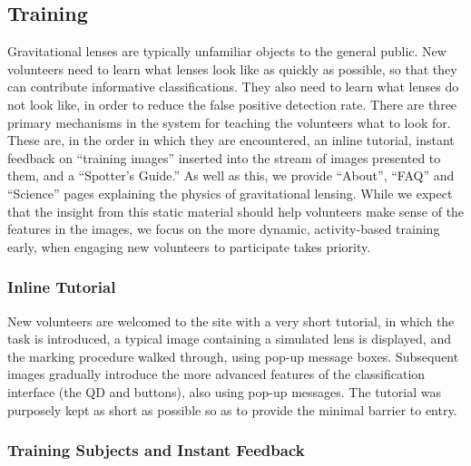 \documentclass[useAMS,usenatbib,a4paper]{mn2e}
\begin{document}
\subsection{Training}
\label{sec:design:training}

Gravitational lenses are typically unfamiliar objects to the general public.
New volunteers need to learn what lenses look like as quickly as possible, so
that they can contribute informative classifications. They also need to learn
what lenses do not look like, in order to reduce the false positive detection
rate. There are three primary mechanisms in the \sw system for teaching the
volunteers what to look for. These are, in the order in which they are
encountered, an inline tutorial, instant feedback on ``training images''
inserted into the stream of images presented to them, and a ``Spotter's
Guide.'' As well as this, we provide ``About'', ``FAQ'' and ``Science'' pages
explaining the physics of gravitational lensing. While we expect that the
insight from this static material should help volunteers make sense of the
features in the images, we focus on the more dynamic, activity-based training
early, when engaging new volunteers to participate takes priority.


\subsubsection{Inline Tutorial}

New volunteers are welcomed to the site with a very short tutorial, in which
the task is introduced, a typical image containing a simulated lens is
displayed, and the marking procedure walked through, using pop-up message
boxes. Subsequent images gradually introduce the more advanced features of the
classification interface (the QD and \Talk buttons), also using pop-up
messages. The tutorial was purposely kept as short as possible so as to
provide the minimal barrier to entry.

\subsubsection{Training Subjects and Instant Feedback}
\end{document}
